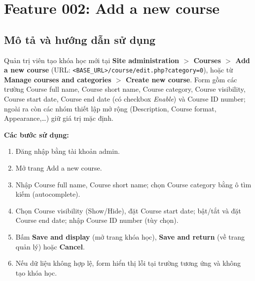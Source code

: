 \section{Feature 002: Add a new course}

\subsection{Mô tả và hướng dẫn sử dụng}
Quản trị viên tạo khóa học mới tại \textbf{Site administration $>$ Courses $>$ Add a new course}
(URL: \texttt{<BASE\_URL>/course/edit.php?category=0}), hoặc từ \textbf{Manage courses and categories $>$ Create new course}.
Form gồm các trường Course full name, Course short name, Course category, Course visibility, Course start date,
Course end date (có checkbox \textit{Enable}) và Course ID number; ngoài ra còn các nhóm thiết lập mở rộng
(Description, Course format, Appearance,\dots) giữ giá trị mặc định.

\textbf{Các bước sử dụng:}
\begin{enumerate}[noitemsep]
  \item Đăng nhập bằng tài khoản admin.
  \item Mở trang Add a new course.
  \item Nhập Course full name, Course short name; chọn Course category bằng ô tìm kiếm (autocomplete).
  \item Chọn Course visibility (Show/Hide), đặt Course start date; bật/tắt và đặt Course end date; nhập Course ID number (tùy chọn).
  \item Bấm \textbf{Save and display} (mở trang khóa học), \textbf{Save and return} (về trang quản lý) hoặc \textbf{Cancel}.
  \item Nếu dữ liệu không hợp lệ, form hiển thị lỗi tại trường tương ứng và không tạo khóa học.
\end{enumerate}


